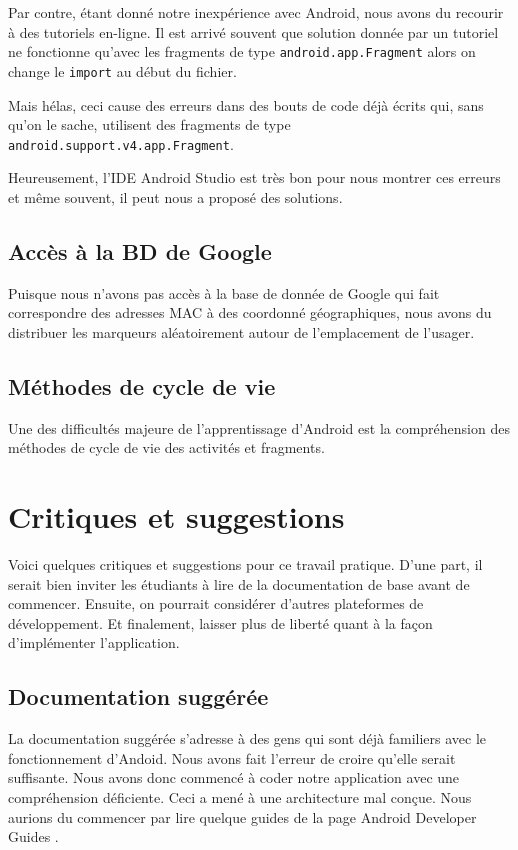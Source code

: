 \documentclass[12pt]{article}
\newcommand\code[1]{\texttt{#1}}
\begin{document}
	Par contre, étant donné notre inexpérience avec Android, nous avons du
	recourir à des tutoriels en-ligne.  Il est arrivé souvent que solution
	donnée par un tutoriel ne fonctionne qu'avec les fragments de type
	\code{android.app.Fragment} alors on change le \code{import} au début du
	fichier.

	Mais hélas, ceci cause des erreurs dans des bouts de code déjà écrits qui,
	sans qu'on le sache, utilisent des fragments de type
	\code{android.support.v4.app.Fragment}.

	Heureusement, l'IDE Android Studio est très bon pour nous montrer ces
	erreurs et même souvent, il peut nous a proposé des solutions.

\subsection{Accès à la BD de Google}

	Puisque nous n'avons pas accès à la base de donnée de Google qui fait
	correspondre des adresses MAC à des coordonné géographiques, nous avons du
	distribuer les marqueurs aléatoirement autour de l'emplacement de
	l'usager.

\subsection{Méthodes de cycle de vie}

	Une des difficultés majeure de l'apprentissage d'Android est la
	compréhension des méthodes de cycle de vie des activités et fragments.

\section{Critiques et suggestions}

	Voici quelques critiques et suggestions pour ce travail pratique.  D'une
	part, il serait bien inviter les étudiants à lire de la documentation de
	base avant de commencer. Ensuite, on pourrait considérer d'autres
	plateformes de développement. Et finalement, laisser plus de liberté quant à
	la façon d'implémenter l'application.

\subsection{Documentation suggérée}

	La documentation suggérée s'adresse à des gens qui sont déjà familiers avec
	le fonctionnement d'Andoid.  Nous avons fait l'erreur de croire qu'elle
	serait suffisante.  Nous avons donc commencé à coder notre application avec
	une compréhension déficiente.  Ceci a mené à une architecture mal conçue.
	Nous aurions du commencer par lire quelque guides de la page Android
	Developer Guides .
\end{document}
